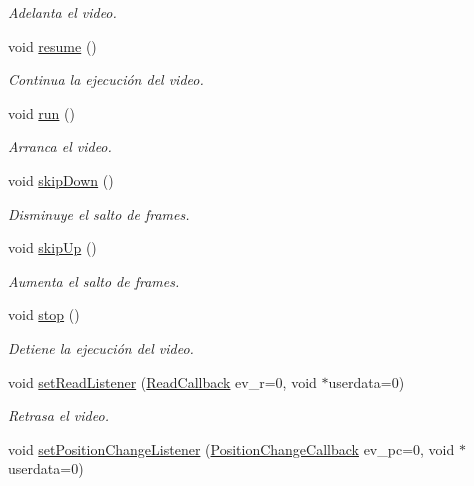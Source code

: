 \begin{DoxyCompactItemize}
\begin{DoxyCompactList}\small\item\em Adelanta el video. \end{DoxyCompactList}\item 
void \hyperlink{class_i3_d_1_1_video_stream_a34e67007241339df2955b649b1a1f1fd}{resume} ()
\begin{DoxyCompactList}\small\item\em Continua la ejecución del video. \end{DoxyCompactList}\item 
void \hyperlink{class_i3_d_1_1_video_stream_a9a32d73484d34da3a6e6337d64271da2}{run} ()
\begin{DoxyCompactList}\small\item\em Arranca el video. \end{DoxyCompactList}\item 
void \hyperlink{class_i3_d_1_1_video_stream_a78751b3d5a094e1b2ae164c9ac0b613b}{skip\+Down} ()
\begin{DoxyCompactList}\small\item\em Disminuye el salto de frames. \end{DoxyCompactList}\item 
void \hyperlink{class_i3_d_1_1_video_stream_a7fb4bcbf3b3dfb6a6fa9701aa6c86a4a}{skip\+Up} ()
\begin{DoxyCompactList}\small\item\em Aumenta el salto de frames. \end{DoxyCompactList}\item 
void \hyperlink{class_i3_d_1_1_video_stream_a1d9f6dd120e21ea4fed67e48dc11d26e}{stop} ()
\begin{DoxyCompactList}\small\item\em Detiene la ejecución del video. \end{DoxyCompactList}\item 
void \hyperlink{class_i3_d_1_1_video_stream_a3ef1a64b23da98808d86cde7d5c59f7f}{set\+Read\+Listener} (\hyperlink{namespace_i3_d_a7005f50d43ac0b10e2f50ab09994f45b}{Read\+Callback} ev\+\_\+r=0, void $\ast$userdata=0)
\begin{DoxyCompactList}\small\item\em Retrasa el video. \end{DoxyCompactList}\item 
void \hyperlink{class_i3_d_1_1_video_stream_a19f732b071dc8870c4db83c8b8abf6d5}{set\+Position\+Change\+Listener} (\hyperlink{namespace_i3_d_a923a852719565a9e40df22d8cd71281e}{Position\+Change\+Callback} ev\+\_\+pc=0, void $\ast$userdata=0)

\end{DoxyCompactItemize}
